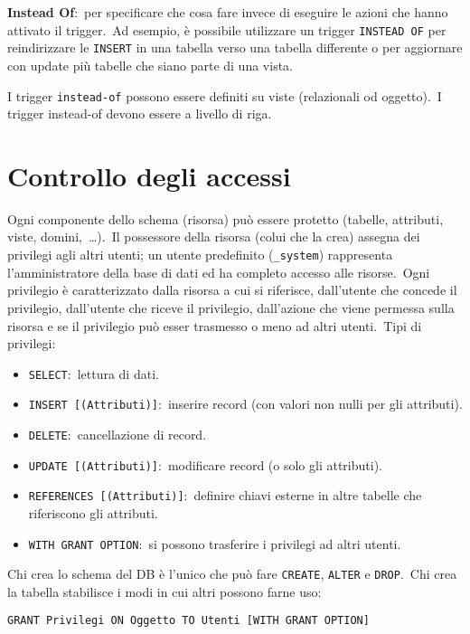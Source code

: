 \noindent\textbf{Instead Of}:\ per specificare che cosa fare invece di eseguire le azioni che hanno attivato il trigger.\
Ad esempio, è possibile utilizzare un trigger \texttt{INSTEAD OF} per reindirizzare le \texttt{INSERT} in una tabella verso una tabella differente o per aggiornare con update più tabelle che siano parte di una vista.

I trigger \texttt{instead-of} possono essere definiti su viste (relazionali od oggetto).\
I trigger instead-of devono essere a livello di riga.

\section{Controllo degli accessi}

Ogni componente dello schema (risorsa) può essere protetto (tabelle, attributi, viste, domini,\ \dots).\
Il possessore della risorsa (colui che la crea) assegna dei privilegi agli altri utenti; un utente predefinito (\verb|_system|) rappresenta l'amministratore della base di dati ed ha completo accesso alle risorse.\
Ogni privilegio è caratterizzato dalla risorsa a cui si riferisce, dall'utente che concede il privilegio, dall'utente che riceve il privilegio, dall'azione che viene permessa sulla risorsa e se il privilegio può esser trasmesso o meno ad altri utenti.\
Tipi di privilegi:

\begin{itemize}
	\item \texttt{SELECT}:\ lettura di dati.
	\item \texttt{INSERT [(Attributi)]}:\ inserire record (con valori non nulli per gli attributi).
	\item \texttt{DELETE}:\ cancellazione di record.
	\item \texttt{UPDATE [(Attributi)]}:\ modificare record (o solo gli attributi).
	\item \texttt{REFERENCES [(Attributi)]}:\ definire chiavi esterne in altre tabelle che riferiscono gli attributi.
	\item \texttt{WITH GRANT OPTION}:\ si possono trasferire i privilegi ad altri utenti.
\end{itemize}

\noindent Chi crea lo schema del DB è l'unico che può fare \texttt{CREATE}, \texttt{ALTER} e \texttt{DROP}.\
Chi crea la tabella stabilisce i modi in cui altri possono farne uso:

\begin{center}
	\texttt{GRANT Privilegi ON Oggetto TO Utenti [WITH GRANT OPTION]}
\end{center}

